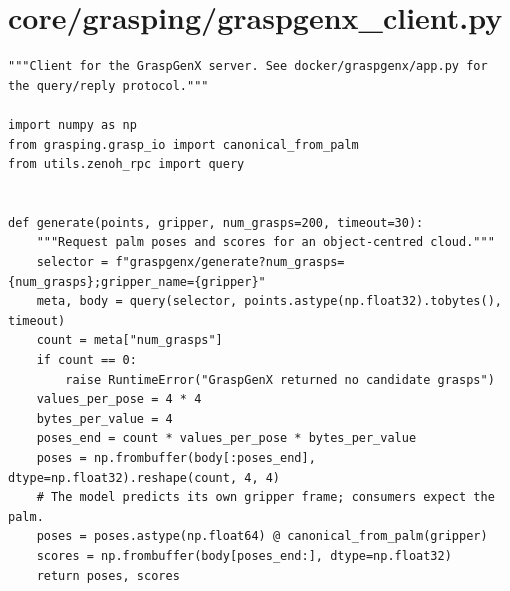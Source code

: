 \documentclass[11pt,a4paper]{book}
\begin{document}
\section{core/grasping/graspgenx\_client.py}
\begin{lstlisting}
"""Client for the GraspGenX server. See docker/graspgenx/app.py for the query/reply protocol."""

import numpy as np
from grasping.grasp_io import canonical_from_palm
from utils.zenoh_rpc import query


def generate(points, gripper, num_grasps=200, timeout=30):
    """Request palm poses and scores for an object-centred cloud."""
    selector = f"graspgenx/generate?num_grasps={num_grasps};gripper_name={gripper}"
    meta, body = query(selector, points.astype(np.float32).tobytes(), timeout)
    count = meta["num_grasps"]
    if count == 0:
        raise RuntimeError("GraspGenX returned no candidate grasps")
    values_per_pose = 4 * 4
    bytes_per_value = 4
    poses_end = count * values_per_pose * bytes_per_value
    poses = np.frombuffer(body[:poses_end], dtype=np.float32).reshape(count, 4, 4)
    # The model predicts its own gripper frame; consumers expect the palm.
    poses = poses.astype(np.float64) @ canonical_from_palm(gripper)
    scores = np.frombuffer(body[poses_end:], dtype=np.float32)
    return poses, scores
\end{lstlisting}
\end{document}
